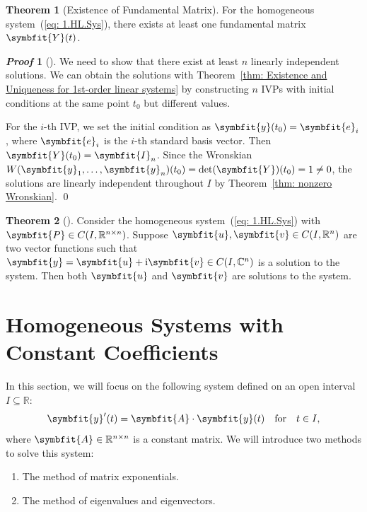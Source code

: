 \documentclass[10pt,UTF8]{article}
\newcommand{\mat}[1]{\symbfit{#1}}
\renewcommand{\vec}[1]{%
  \ifnum0\ifcat#1a1\else0\fi>0
  \symbfit{#1}  %
  \else
  \symbf{#1}  %
  \fi
}
\newenvironment{theoremBox}
{ \bigskip
  \begin{tcolorbox}[colback=yellow!5!white,colframe=yellow!75!black,parbox=false,before
  upper=\par,before lower=\par]}
  {
\end{tcolorbox}}
\theoremstyle{definition}
\newtheorem{definition inner}{Definition}[section]
\theoremstyle{definition}
\newtheorem{theorem inner}{Theorem}[section]
\newenvironment{theorem}[1][]
{
  \begin{theoremBox}
  \begin{theorem inner}[#1]\hfill\par}
    {
    \end{theorem inner}
\end{theoremBox}}
\theoremstyle{definition}
\newtheorem*{proof inner}{\textit{Proof}}
\renewenvironment{proof}[1][]
{
\begin{proof inner}[#1]\hfill\par}
  {\qed\vphantom{.}
\end{proof inner}}
\theoremstyle{plain}
\newtheorem{tip inner}{Tip}[section]
\theoremstyle{remark}
\newcommand{\iu}{\mathrm{i}}  %
\begin{document}
\begin{theorem}[Existence of Fundamental Matrix]
  {}\label{thm: Existence of Fundamental Matrix}
  For the homogeneous system~(\ref{eq: 1.HL.Sys}),
  there exists at least one fundamental matrix \(\mat{Y}(t)\).
\end{theorem}
\begin{proof}
  We need to show that there exist at least \(n\) linearly
  independent solutions.
  We can obtain the solutions with
  Theorem~\ref{thm: Existence and Uniqueness for 1st-order linear systems}
  by constructing \(n\) IVPs with initial conditions
  at the same point \(t_0\) but different values.

  For the \(i\)-th IVP, we set the initial condition as
  \(\vec{y}(t_0) = \vec{e}_i\),
  where \(\vec{e}_i\) is the \(i\)-th standard basis vector.
  Then \(\mat{Y}(t_0) = \mat{I}_n\).
  Since the Wronskian \(W(\vec{y}_1, \ldots, \vec{y}_n)(t_0) =
  \det(\mat{Y})(t_0) = 1 \neq 0\),
  the solutions are linearly independent throughout \(I\)
  by Theorem~\ref{thm: nonzero Wronskian}.
\end{proof}

\begin{theorem}
  Consider the homogeneous
  system~(\ref{eq: 1.HL.Sys})
  with \(\mat{P} \in C(I, \mathbb{R}^{n \times n})\).
  Suppose \(\vec{u}, \vec{v} \in C(I, \mathbb{R}^n)\)
  are two vector functions such that
  \(\vec{y} = \vec{u} + \iu\vec{v} \in C(I, \mathbb{C}^n)\)
  is a solution to the system.
  Then both \(\vec{u}\) and \(\vec{v}\) are solutions to the system.
\end{theorem}

\section{Homogeneous Systems with Constant Coefficients}

In this section, we will focus on the following system
defined on an open interval \(I \subseteq \mathbb{R}\):
\begin{equation}
  \vec{y}'(t) = \mat{A} \cdot \vec{y}(t) \qfor t\in I,
  \label{eq: 1.HLCC.Sys}
\end{equation}
where \(\mat{A} \in \mathbb{R}^{n \times n}\) is a constant matrix.
We will introduce two methods to solve this system:
\begin{enumerate}
  \item The method of matrix exponentials.
  \item The method of eigenvalues and eigenvectors.
\end{enumerate}
\end{document}
